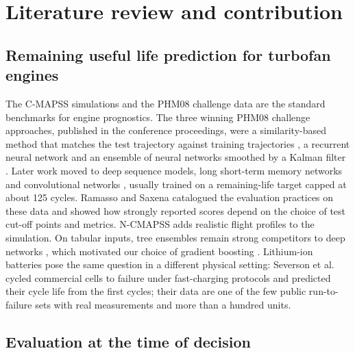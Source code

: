\documentclass[a4paper,fleqn,doubleblind]{cas-dc}
\begin{document}
\section{Literature review and contribution}\label{sec:2}

\subsection{Remaining useful life prediction for turbofan engines}

The C-MAPSS simulations and the PHM08 challenge data \cite{saxena2008} are the standard benchmarks for engine prognostics. The three winning PHM08 challenge approaches, published in the conference proceedings, were a similarity-based method that matches the test trajectory against training trajectories \cite{wang2008}, a recurrent neural network \cite{heimes2008} and an ensemble of neural networks smoothed by a Kalman filter \cite{peel2008}. Later work moved to deep sequence models, long short-term memory networks \cite{zheng2017} and convolutional networks \cite{li2018}, usually trained on a remaining-life target capped at about 125 cycles. Ramasso and Saxena \cite{ramasso2014} catalogued the evaluation practices on these data and showed how strongly reported scores depend on the choice of test cut-off points and metrics. N-CMAPSS \cite{ariaschao2021} adds realistic flight profiles to the simulation. On tabular inputs, tree ensembles remain strong competitors to deep networks \cite{grinsztajn2022}, which motivated our choice of gradient boosting \cite{friedman2001}. Lithium-ion batteries pose the same question in a different physical setting: Severson et al. \cite{severson2019} cycled commercial cells to failure under fast-charging protocols and predicted their cycle life from the first cycles; their data are one of the few public run-to-failure sets with real measurements and more than a hundred units.

\subsection{Evaluation at the time of decision}
\end{document}
